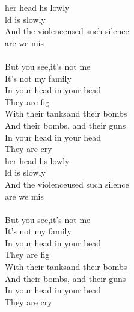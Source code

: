 \begin{cancion}%
	her head hs lowly\\
	ld is slowly   \\
	And the violenceused such silence\\
	 are we mis\\
	\jump\\
	But you see,it's not me\\
	It's not my  family\\
	In your head  in your head\\
	They are fig\\
	With their tanksand their bombs\\
	And their bombs,  and their guns\\
	In your head   in your head \\
	They are cry\\
	her head hs lowly\\
	ld is slowly   \\
	And the violenceused such silence\\
	 are we mis\\
	\jump\\
	But you see,it's not me\\
	It's not my  family\\
	In your head  in your head\\
	They are fig\\
	With their tanksand their bombs\\
	And their bombs,  and their guns\\
	In your head   in your head \\
	They are cry\\
\end{cancion}%

